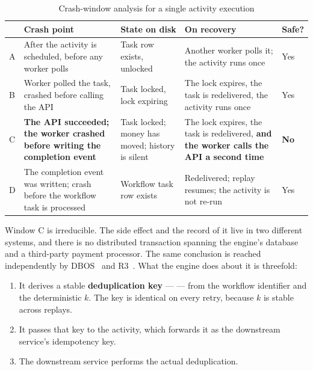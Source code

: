 \begin{table}[htbp]
  \centering
  \caption{Crash-window analysis for a single activity execution}
  \label{tab:crashwindows}
  \small
  \begin{tabular}{@{}p{0.18in}p{1.22in}p{1.05in}p{1.5in}p{0.5in}@{}}
    \toprule
    & \textbf{Crash point} & \textbf{State on disk} & \textbf{On recovery} &
    \textbf{Safe?} \\
    \midrule
    A & After the activity is scheduled, before any worker polls &
      Task row exists, unlocked &
      Another worker polls it; the activity runs once & Yes \\
    B & Worker polled the task, crashed before calling the API &
      Task locked, lock expiring &
      The lock expires, the task is redelivered, the activity runs once & Yes \\
    C & \textbf{The API succeeded; the worker crashed before writing the
      completion event} &
      Task locked; money has moved; history is silent &
      The lock expires, the task is redelivered, \textbf{and the worker calls
      the API a second time} & \textbf{No} \\
    D & The completion event was written; crash before the workflow task is
      processed & Workflow task row exists &
      Redelivered; replay resumes; the activity is not re-run & Yes \\
    \bottomrule
  \end{tabular}
\end{table}

Window C is irreducible. The side effect and the record of it live in two
different systems, and there is no distributed transaction spanning the
engine's database and a third-party payment processor. The same conclusion is
reached independently by DBOS~\cite{dbos2025} and R3~\cite{r3vldb2023}. What
the engine does about it is threefold:

\begin{enumerate}[leftmargin=*, itemsep=1pt]
  \item It derives a stable \textbf{deduplication key} ---  ---
    from the workflow identifier and the deterministic $k$. The key is
    identical on every retry, because $k$ is stable across replays.
  \item It passes that key to the activity, which forwards it as the
    downstream service's idempotency key.
  \item The downstream service performs the actual deduplication.
\end{enumerate}

